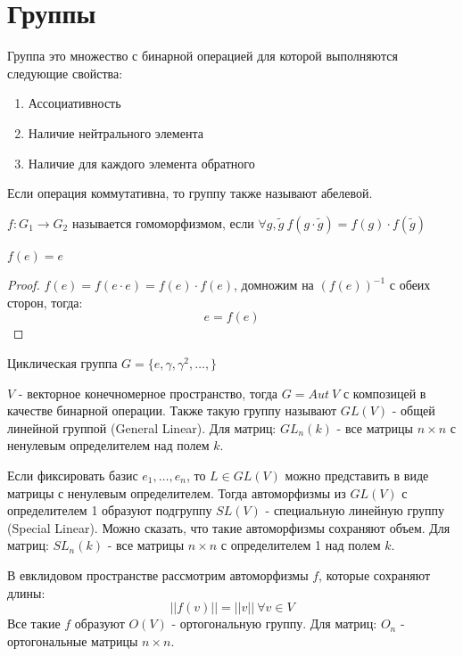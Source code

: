 \section{Группы}
\begin{definition}
	Группа это множество с бинарной операцией для которой выполняются следующие свойства: 
	\begin{enumerate}
		\item Ассоциативность
		\item Наличие нейтрального элемента
		\item Наличие для каждого элемента обратного
	\end{enumerate}
	Если операция коммутативна, то группу также называют абелевой.
\end{definition}

\begin{definition}
	$f: G_1 \to G_2$ называется гомоморфизмом, если $\forall g, \widetilde{g} \ f(g \cdot \widetilde{g}) = f(g) \cdot f(\widetilde{g})$
\end{definition}

\begin{prop}
	$f(e) = e$
	\begin{proof}
		$f(e) = f(e \cdot e) = f(e) \cdot f(e)$, домножим на $(f(e))^{-1}$ с обеих сторон, тогда: $$e = f(e)$$
	\end{proof}
\end{prop}

\begin{examplelist}
	\item Циклическая группа $G = \{e, \gamma, \gamma^2, \dots, \}$
	\item $V$ - векторное конечномерное пространство, тогда $G = Aut\ V$ с композицей в качестве бинарной операции. Также такую группу называют $GL(V)$ - общей линейной группой (General Linear). Для матриц: $GL_n(k)$ - все матрицы $n \times n$ с ненулевым определителем над полем $k$.
	\item Если фиксировать базис $e_1, \dots, e_n$, то $L \in GL(V)$ можно представить в виде матрицы с ненулевым определителем. Тогда автоморфизмы из $GL(V)$ с определителем 1 образуют подгруппу $SL(V)$ - специальную линейную группу (Special Linear). Можно сказать, что такие автоморфизмы сохраняют объем. Для матриц: $SL_n(k)$ - все матрицы $n \times n$ с определителем 1 над полем $k$.
	\item В евклидовом пространстве рассмотрим автоморфизмы $f$, которые сохраняют длины: $$||f(v)|| = ||v|| \ \forall v \in V$$ Все такие $f$ образуют $O(V)$ - ортогональную группу. Для матриц: $O_n$ - ортогональные матрицы $n \times n$.
\end{examplelist}

